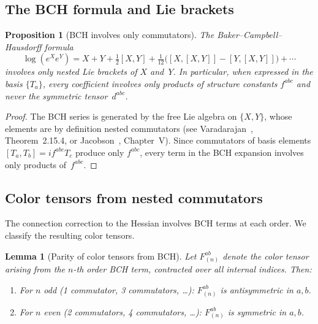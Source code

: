 \documentclass[11pt]{article}
\newtheorem{lemma}[theorem]{Lemma}
\newtheorem{proposition}[theorem]{Proposition}
\theoremstyle{definition}
\begin{document}
\subsection{The BCH formula and Lie brackets}

\begin{proposition}[BCH involves only commutators]
\label{sun-prop:BCH}
The Baker--Campbell--Hausdorff formula
\begin{equation}\label{sun-eq:BCH}
\log(e^X e^Y)=X+Y+\tfrac{1}{2}[X,Y]
+\tfrac{1}{12}\bigl([X,[X,Y]]-[Y,[X,Y]]\bigr)+\cdots
\end{equation}
involves only nested Lie brackets of $X$ and~$Y$.
In particular, when expressed in the basis $\{T_a\}$,
every coefficient involves only products of structure
constants $f^{abc}$ and never the symmetric
tensor~$d^{abc}$.
\end{proposition}

\begin{proof}
The BCH series is generated by the free Lie algebra on
$\{X,Y\}$, whose elements are by definition nested
commutators (see Varadarajan~\cite{Varadarajan},
Theorem~2.15.4, or Jacobson~\cite{Jacobson},
Chapter~V).  Since commutators of basis elements
$[T_a,T_b]=if^{abc}T_c$ produce only $f^{abc}$, every
term in the BCH expansion involves only products
of~$f^{abc}$.
\end{proof}

\subsection{Color tensors from nested commutators}

The connection correction to the Hessian involves BCH
terms at each order.  We classify the resulting color
tensors.

\begin{lemma}[Parity of color tensors from BCH]
\label{sun-lem:color-parity}
Let $F^{ab}_{(n)}$ denote the color tensor arising from
the $n$-th order BCH term, contracted over all internal
indices.  Then:
\begin{enumerate}[nosep,label=(\roman*)]
\item For $n$ odd (1 commutator, 3 commutators, \ldots):
$F^{ab}_{(n)}$ is antisymmetric in $a,b$.
\item For $n$ even (2 commutators, 4 commutators, \ldots):
$F^{ab}_{(n)}$ is symmetric in $a,b$.
\end{enumerate}
\end{lemma}
\end{document}

